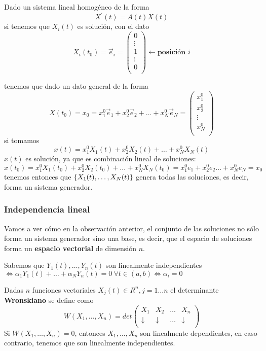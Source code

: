 \documentclass{mathnotes}
\begin{document}
\obs 

Dado un sistema lineal homogéneo de la forma $$X^\prime(t) = A(t)X(t)$$ si tenemos que $X_i(t)$ es solución, con el dato $$X_i(t_0) = \vec{e}_i = \begin{pmatrix}
0\\
\vdots\\
1\\
\vdots\\
0\\
\end{pmatrix} \leftarrow \textbf{posición } i$$

\noindent tenemos que dado un dato general de la forma $$X(t_0) = x_0 = x_1^0\vec{e}_1 + x_2^0\vec{e}_2+\hdots+x_N^0\vec{e}_N = \begin{pmatrix}
x_1^0\\
x_2^0\\
\vdots\\
x_N^0\\
\end{pmatrix}$$
si tomamos $$x(t) = x_1^0X_1(t)+x_2^0X_2(t)+\hdots +x_N^0X_N(t)$$ $x(t)$ es solución, ya que es combinación lineal de soluciones:
$$x(t_0) = x_1^0X_1(t_0)+x_2^0X_2(t_0)+\hdots+x_N^0X_N(t_0) = x_1^0e_1+x_2^0e_2\hdots+x_N^0e_N = x_0$$
tenemos entonces que $\{ X_1(t),\hdots,X_N(t) \}$ genera todas las soluciones, es decir, forma un sistema generador.

\subsubsection{Independencia lineal}
Vamos a ver cómo en la observación anterior, el conjunto de las soluciones no sólo forma un sistema generador sino una base, es decir, que el espacio de soluciones forma un \textbf{espacio vectorial} de dimensión $n$.

Sabemos que 
$Y_1(t), \hdots, Y_n(t) $ son linealmente independientes $ \iff \alpha_1Y_1(t)+\hdots+\alpha_NY_n(t) = 0\ \forall t \in (a, b) \iff \alpha_i = 0$

\begin{definition}
Dadas $n$ funciones vectoriales $X_j(t) \in R^n, j=1\hdots n$ el determinante \textbf{Wronskiano} se define como
$$W(X_1, \hdots, X_n) = det 
\begin{pmatrix}
X_1 & X_2 & \hdots & X_n\\
\downarrow&\downarrow&\hdots&\downarrow\\
\end{pmatrix}$$
Si $W(X_1, \hdots, X_n) = 0$, entonces $X_1, \hdots, X_n$ son linealmente dependientes, en caso contrario, tenemos que son linealmente independientes.
\end{definition}
\end{document}

